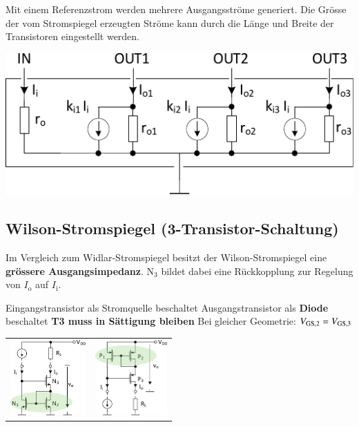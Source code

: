 \begin{minipage}[t]{0.48\columnwidth}
    Mit einem Referenzstrom werden mehrere Ausgangsströme generiert. 
    Die Grösse der vom Stromspiegel erzeugten Ströme kann durch die Länge und Breite der Transistoren eingestellt werden.
\end{minipage}
\hfill
\begin{minipage}[t]{0.48\columnwidth}
    \includegraphics[width=\columnwidth, align=t]{images/06_mehrfachstromspiegel.pdf}
\end{minipage}



\subsection{Wilson-Stromspiegel (3-Transistor-Schaltung)}
Im Vergleich zum Widlar-Stromspiegel besitzt der Wilson-Stromspiegel eine \textbf{grössere Ausgangsimpedanz}.
$\text{N}_3$ bildet dabei eine Rückkopplung zur Regelung von $I_\text{o}$ auf $I_\text{i}$.

\begin{minipage}[c]{0.35\columnwidth}
    \raggedright
    \begin{outline}
        \1 Eingangstransistor als Stromquelle beschaltet
        \1 Ausgangstransistor als \textbf{Diode} beschaltet
        \1 \textbf{T3 muss in Sättigung bleiben}
        \1 Bei gleicher Geometrie: $V_{\rm GS,2} = V_{\rm GS,3}$
    \end{outline}
\end{minipage}
\hfill
\begin{minipage}[c]{0.64\columnwidth}
     \begin{tabular}{c c@{}}
        \includegraphics[height=2.9cm, align=t]{images/06_stormspiegel_wilson_nKanal.pdf} & 
        \includegraphics[height=2.9cm, align=t]{images/06_stormspiegel_wilson_pKanal.pdf}
    \end{tabular}
    
\end{minipage}


